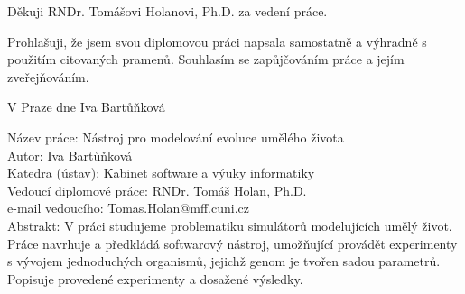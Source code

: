 \documentclass[a4paper,12pt]{report}
\begin{document}

Děkuji RNDr. Tomášovi Holanovi, Ph.D. za vedení práce.

\vspace{\fill} %
\noindent Prohlašuji, že jsem svou diplomovou práci napsala samostatně a výhradně s použitím citovaných pramenů. Souhlasím se zapůjčováním práce a jejím zveřejňováním.

\bigskip
\noindent V Praze dne \hspace{\fill}Iva Bartů\v{n}kov\'{a}\\ %


\tableofcontents %



\newpage %

\newpage %

\noindent
Název práce: N\'{a}stroj pro modelov\'{a}n\'{i} evoluce um\v{e}l\'{e}ho \v{z}ivota\\
Autor: Iva Bartů\v{n}kov\'{a}\\
Katedra (ústav): Kabinet software a v\'{y}uky informatiky\\
Vedoucí diplomové práce: RNDr. Tom\'{a}\v{s} Holan, Ph.D.\\
e-mail vedoucího: Tomas.Holan@mff.cuni.cz\\

\noindent Abstrakt: V práci studujeme problematiku simulátorů modelujících umělý život. Práce navrhuje a předkládá softwarový nástroj, umožňující provádět experimenty s vývojem jednoduchých organismů, jejichž genom je tvořen sadou parametrů. Popisuje provedené experimenty a dosažené výsledky.


\end{document}
